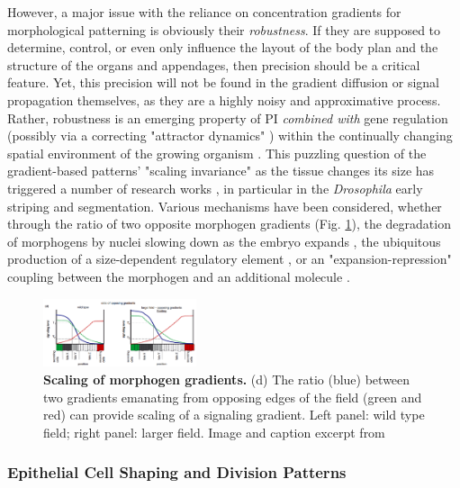   However, a major issue with the reliance on concentration gradients for morphological patterning is obviously their \textit{robustness}\cite{Barkai:2009cs}. If they are supposed to determine, control, or even only influence the layout of the body plan and the structure of the organs and appendages, then precision should be a critical feature. Yet, this precision will not be found in the gradient diffusion or signal propagation themselves, as they are a highly noisy and approximative process. Rather, robustness is an emerging property of PI \textit{combined with} gene regulation (possibly via a correcting "attractor dynamics" \cite{Kauffman:1969ua}\cite{Reinitz:1995ws}) within the continually changing spatial environment of the growing organism \cite{RollandLagan:2012vr}. This puzzling question of the gradient-based patterns' "scaling invariance" as the tissue changes its size has triggered a number of research works \cite{BenZvi:2011ky}, in particular in the \textit{Drosophila} early striping and segmentation. Various mechanisms have been considered, whether through the ratio of two opposite morphogen gradients \cite{McHale:2006cf} (Fig. \ref{gradient_ben_zvi_2011}), the degradation of morphogens by nuclei slowing down as the embryo expands , the ubiquitous production of a size-dependent regulatory element \cite{Othmer:1980vg}, or an "expansion-repression" coupling between the morphogen and an additional molecule \cite{BenZvi:2011ky}. 
\begin{figure}
\begin{center}
\includegraphics[width=0.4\textwidth]{../../images/Development_Review/theoretical_model/gradient/ben_zvi_2011.png}
\end{center}
\caption{\textbf{Scaling of morphogen gradients.} (d) The ratio (blue) between two gradients emanating from opposing edges of the field (green and red) can provide scaling of a signaling gradient. Left panel: wild type field; right panel: larger field. Image and caption excerpt from \cite{BenZvi:2011ky}}
\label{gradient_ben_zvi_2011}
\end{figure}

\subsubsection{Epithelial Cell Shaping and Division Patterns}

